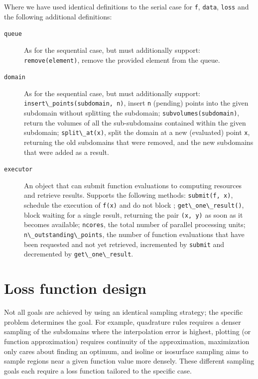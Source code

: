 Where we have used identical definitions to the serial case for \passthrough{\lstinline!f!}, \passthrough{\lstinline!data!}, \passthrough{\lstinline!loss!} and the following additional definitions:

\begin{description}
\item[\texttt{queue}]
As for the sequential case, but must additionally support: \passthrough{\lstinline!remove(element)!}, remove the provided element from the queue.
\item[\texttt{domain}]
As for the sequential case, but must additionally support: \passthrough{\lstinline!insert\_points(subdomain, n)!}, insert \passthrough{\lstinline!n!} (pending) points into the given subdomain without splitting the subdomain; \passthrough{\lstinline!subvolumes(subdomain)!}, return the volumes of all the sub-subdomains contained within the given subdomain; \passthrough{\lstinline!split\_at(x)!}, split the domain at a new (evaluated) point \passthrough{\lstinline!x!}, returning the old subdomains that were removed, and the new subdomains that were added as a result.
\item[\texttt{executor}]
An object that can submit function evaluations to computing resources and retrieve results.
Supports the following methods: \passthrough{\lstinline!submit(f, x)!}, schedule the execution of \passthrough{\lstinline!f(x)!} and do not block ; \passthrough{\lstinline!get\_one\_result()!}, block waiting for a single result, returning the pair \passthrough{\lstinline!(x, y)!} as soon as it becomes available; \passthrough{\lstinline!ncores!}, the total number of parallel processing units; \passthrough{\lstinline!n\_outstanding\_points!}, the number of function evaluations that have been requested and not yet retrieved, incremented by \passthrough{\lstinline!submit!} and decremented by \passthrough{\lstinline!get\_one\_result!}.
\end{description}

\hypertarget{sec:loss}{%
\section{Loss function design}\label{sec:loss}}


Not all goals are achieved by using an identical sampling strategy; the specific problem determines the goal.
For example, quadrature rules requires a denser sampling of the subdomains where the interpolation error is highest, plotting (or function approximation) requires continuity of the approximation, maximization only cares about finding an optimum, and isoline or isosurface sampling aims to sample regions near a given function value more densely.
These different sampling goals each require a loss function tailored to the specific case.

